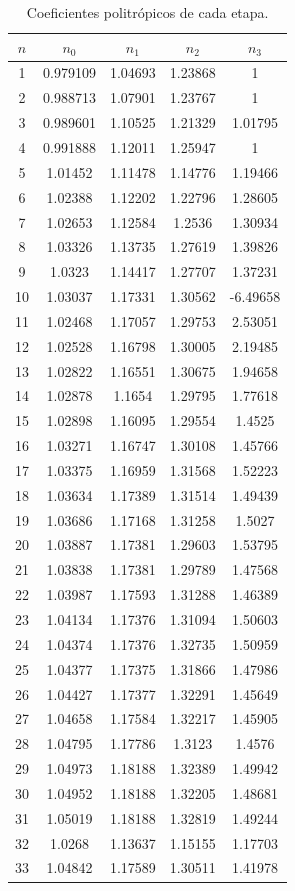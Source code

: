 \documentclass[11pt,letterpaper]{extarticle}        %
\numberwithin{equation}{section}                    %
\begin{document}
\begin{table}[H]
\centering
\caption{Coeficientes politrópicos de cada etapa.}
\label{t:Coef}
\begin{tabular}{|ccccc|}
\hline
$n$ & $n_0$ & $n_1$ & $n_2$ & $n_3$ \\
\hline \hline
1 & 0.979109 & 1.04693 & 1.23868 & 1 \\
2 & 0.988713 & 1.07901 & 1.23767 & 1 \\
3 & 0.989601 & 1.10525 & 1.21329 & 1.01795 \\
4 & 0.991888 & 1.12011 & 1.25947 & 1 \\
5 & 1.01452 & 1.11478 & 1.14776 & 1.19466 \\
6 & 1.02388 & 1.12202 & 1.22796 & 1.28605 \\
7 & 1.02653 & 1.12584 & 1.2536 & 1.30934 \\
8 & 1.03326 & 1.13735 & 1.27619 & 1.39826 \\
9 & 1.0323 & 1.14417 & 1.27707 & 1.37231 \\
10 & 1.03037 & 1.17331 & 1.30562 & -6.49658 \\
11 & 1.02468 & 1.17057 & 1.29753 & 2.53051 \\
12 & 1.02528 & 1.16798 & 1.30005 & 2.19485 \\
13 & 1.02822 & 1.16551 & 1.30675 & 1.94658 \\
14 & 1.02878 & 1.1654 & 1.29795 & 1.77618 \\
15 & 1.02898 & 1.16095 & 1.29554 & 1.4525 \\
16 & 1.03271 & 1.16747 & 1.30108 & 1.45766 \\
17 & 1.03375 & 1.16959 & 1.31568 & 1.52223 \\
18 & 1.03634 & 1.17389 & 1.31514 & 1.49439 \\
19 & 1.03686 & 1.17168 & 1.31258 & 1.5027 \\
20 & 1.03887 & 1.17381 & 1.29603 & 1.53795 \\
21 & 1.03838 & 1.17381 & 1.29789 & 1.47568 \\
22 & 1.03987 & 1.17593 & 1.31288 & 1.46389 \\
23 & 1.04134 & 1.17376 & 1.31094 & 1.50603 \\
24 & 1.04374 & 1.17376 & 1.32735 & 1.50959 \\
25 & 1.04377 & 1.17375 & 1.31866 & 1.47986 \\
26 & 1.04427 & 1.17377 & 1.32291 & 1.45649 \\
27 & 1.04658 & 1.17584 & 1.32217 & 1.45905 \\
28 & 1.04795 & 1.17786 & 1.3123 & 1.4576 \\
29 & 1.04973 & 1.18188 & 1.32389 & 1.49942 \\
30 & 1.04952 & 1.18188 & 1.32205 & 1.48681 \\
31 & 1.05019 & 1.18188 & 1.32819 & 1.49244 \\
32 & 1.0268 & 1.13637 & 1.15155 & 1.17703 \\
33 & 1.04842 & 1.17589 & 1.30511 & 1.41978 \\
\hline

\end{tabular}
\end{table}
\end{document}

